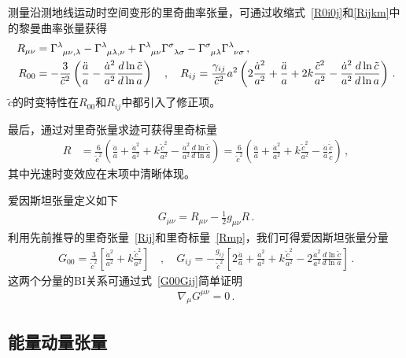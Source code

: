 \documentclass[jkps,preprint,fleqn]{revtex4}
\newcommand{\tc}{\tilde{c}}
\begin{document}
\begin{CJK*}{UTF8}{gbsn}
测量沿测地线运动时空间变形的里奇曲率张量，可通过收缩式~\eqref{R0i0j}和\eqref{Rijkm}中的黎曼曲率张量获得
\begin{align}
R_{\mu\nu} &= \tensor{\Gamma}{^\lambda_\mu_\nu_,_\lambda} - \tensor{\Gamma}{^\lambda_\mu_\lambda_,_\nu} + \tensor{\Gamma}{^\lambda_\mu_\nu} \tensor{\Gamma}{^\sigma_\lambda_\sigma} - \tensor{\Gamma}{^\sigma_\mu_\lambda} \tensor{\Gamma}{^\lambda_\nu_\sigma} \label{Rmn} \,, \\ R_{00} &= -\frac{3}{\tc^2} \left( \frac{\ddot{a}}{a} - \frac{\dot{a}^2}{a^2} \frac{d \ln \tc}{ d \ln a}  \right) \quad , \quad R_{ij} = \frac{\gamma_{ij}}{\tc^2} a^2 \left( 2 \frac{\dot{a}^2}{a^2} + \frac{\ddot{a}}{a} + 2 k \frac{\tc^2}{a^2} - \frac{\dot{a}^2}{a^2} \frac{d \ln \tc}{ d \ln a}  \right) \label{Rij} \,. \end{align}
$\tc$的时变特性在$R_{00}$和$R_{ij}$中都引入了修正项。

最后，通过对里奇张量求迹可获得里奇标量
\begin{align} R &= \frac{6}{\tc^2} \left( \frac{\ddot{a}}{a} + \frac{\dot{a}^2}{a^2} + k \frac{\tc^2}{a^2} - \frac{\dot{a}^2}{a^2} \frac{d \ln \tc}{ d \ln a}  \right) =  \frac{6}{\tc^2} \left( \frac{\ddot{a}}{a} + \frac{\dot{a}^2}{a^2} + k \frac{\tc^2}{a^2} - \frac{\dot{a}}{a} \frac{\dot{\tc}}{\tc}  \right)  \label{Rmp} \,, \end{align}
其中光速时变效应在末项中清晰体现。

爱因斯坦张量定义如下
\begin{align}
G_{\mu\nu} = R_{\mu\nu} - \frac{1}{2} g_{\mu\nu} R \label{Gmunu} \,.
\end{align}
利用先前推导的里奇张量~\eqref{Rij}和里奇标量~\eqref{Rmp}，我们可得爱因斯坦张量分量
\begin{align}
G_{00} = \frac{3}{\tc^2} \left[ \frac{\dot{a}^2}{a^2} + k \frac{\tc^2}{a^2} \right] \quad , \quad G_{ij} = -\frac{g_{ij}}{\tc^2} \left[ 2 \frac{\ddot{a}}{a} + \frac{\dot{a}^2}{a^2} + k \frac{\tc^2}{a^2} - 2 \frac{\dot{a}^2}{a^2} \frac{d \ln \tc}{d \ln a} \right] \,. \label{G00Gij}
\end{align}
这两个分量的BI关系可通过式~\eqref{G00Gij}简单证明
\begin{align}
\nabla_{\mu} G^{\mu \nu} = 0 \label{nablaGmunu} \,.
\end{align}
\subsection{能量动量张量}\label{subsec:Tmunu}


\end{CJK*}
\end{document}
